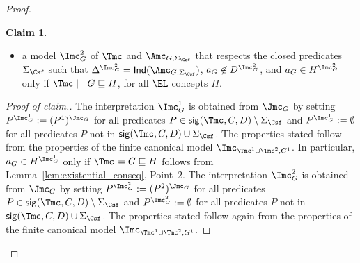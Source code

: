 \documentclass{lmcs}
\theoremstyle{definition}
\newtheorem{claim}{Claim}
\let\OriginalQedSymbol\qedsymbol
\renewcommand{\qedsymbol}{\OriginalQedSymbol\setcounter{claim}{0}}
\let\NormalQedSymbol\qedsymbol
\newenvironment{clmproof}[1]{\renewcommand{\qedsymbol}{$\dashv$}\begin{proof}[Proof of claim.]\space#1}{\end{proof}\renewcommand{\qedsymbol}{\NormalQedSymbol}}
\begin{document}
\begin{proof}
\begin{claim}
\begin{itemize}
\item a model $\Imc_{G}^{2}$ of $\Tmc$ and $\Amc_{G,\Sigma_\Csf}$ that respects the closed predicates $\Sigma_{\Csf}$
such that $\Delta^{\Imc_{G}^{2}}={\sf Ind}(\Amc_{G,\Sigma_\Csf})$, $a_{G}\not\in D^{\Imc_{G}^{2}}$, and $a_{G}\in H^{\Imc_{G}^{2}}$
only if $\Tmc\models G\sqsubseteq H$, for all $\EL$ concepts $H$.
\end{itemize}
\end{claim}
\begin{clmproof}
The interpretation $\Imc_{G}^{1}$ is obtained from $\Jmc_{G}$ by setting $P^{\Imc_{G}^{1}}:= (P^{1})^{\Jmc_{G}}$ for all predicates $P\in {\sf sig}(\Tmc,C,D)\setminus \Sigma_\Csf$ 
and $P^{\Imc_{G}^{1}}:= \emptyset$ for all predicates $P$ not in ${\sf sig}(\Tmc,C,D) \cup \Sigma_{\Csf}$. The properties stated follow from the properties of the finite canonical
model $\Imc_{\Tmc^{1}\cup \Tmc^{2},G^{1}}$. In particular, $a_{G}\in H^{\Imc_{G}^{1}}$ only if $\Tmc\models G\sqsubseteq H$ follows from Lemma~\ref{lem:existential_conseq}, Point~2.
The interpretation $\Imc_{G}^{2}$ is obtained from $\Jmc_{G}$ by setting $P^{\Imc_{G}^{2}}:= (P^{2})^{\Jmc_{G}}$ for all predicates $P\in {\sf sig}(\Tmc,C,D)\setminus \Sigma_\Csf$ 
and $P^{\Imc_{G}^{2}}:= \emptyset$ for all predicates $P$ not in ${\sf sig}(\Tmc,C,D) \cup \Sigma_{\Csf}$. The properties stated follow again 
from the properties of the finite canonical model $\Imc_{\Tmc^{1}\cup \Tmc^{2},G^{1}}$.
\end{clmproof}


\end{proof}
\end{document}
